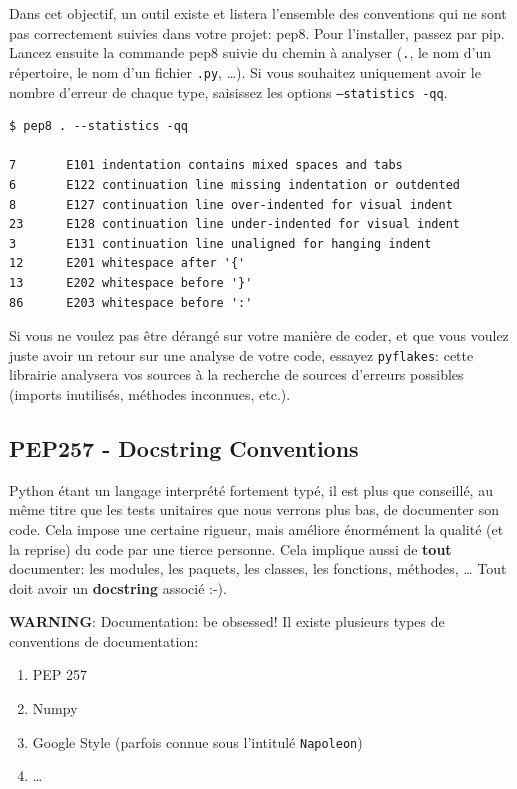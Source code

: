 \documentclass[11pt]{amsbook}
\newcommand{\admonition}[2]{\textbf{#1}: {#2}}
\begin{document}
Dans cet objectif, un outil existe et listera l’ensemble des conventions qui ne sont pas correctement suivies dans votre projet: pep8.
Pour l’installer, passez par pip. Lancez ensuite la commande pep8 suivie du chemin à analyser (\texttt{.}, le nom d’un répertoire, le nom d’un fichier \texttt{.py}, …​).
Si vous souhaitez uniquement avoir le nombre d’erreur de chaque type, saisissez les options \texttt{--statistics -qq}.


\begin{verbatim}
$ pep8 . --statistics -qq

7       E101 indentation contains mixed spaces and tabs
6       E122 continuation line missing indentation or outdented
8       E127 continuation line over-indented for visual indent
23      E128 continuation line under-indented for visual indent
3       E131 continuation line unaligned for hanging indent
12      E201 whitespace after '{'
13      E202 whitespace before '}'
86      E203 whitespace before ':'
\end{verbatim}

Si vous ne voulez pas être dérangé sur votre manière de coder, et que vous voulez juste avoir un retour sur une analyse de votre code, essayez \texttt{pyflakes}: cette librairie analysera vos sources à la recherche de sources d’erreurs possibles (imports inutilisés, méthodes inconnues, etc.).


\hypertarget{x-pep257---docstring-conventions}{\subsection{PEP257 - Docstring Conventions}}
Python étant un langage interprété fortement typé, il est plus que conseillé, au même titre que les tests unitaires que nous verrons plus bas, de documenter son code.
Cela impose une certaine rigueur, mais améliore énormément la qualité (et la reprise) du code par une tierce personne.
Cela implique aussi de \textbf{tout} documenter: les modules, les paquets, les classes, les fonctions, méthodes, …​
Tout doit avoir un \textbf{docstring} associé :-).


\admonition{WARNING}{Documentation: be obsessed!}
Il existe plusieurs types de conventions de documentation:


\begin{enumerate}

\item{PEP 257}

\item{Numpy}

\item{Google Style (parfois connue sous l’intitulé \texttt{Napoleon})}

\item{…​}

\end{enumerate}
\end{document}
